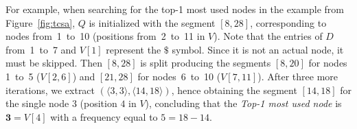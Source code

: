 \begin{itemize}[leftmargin=3mm]
\begin{itemize}
	For example, when searching for the top-1 most used nodes in the example from Figure~\ref{fig:tcsa}, $Q$ is initialized with
	the segment $[8, 28]$, corresponding to nodes from~1~to~10 (positions from~2~to~11 in $V$). Note
	that the entries of $D$ from~1~to~7 and $V[1]$ represent the $\$$ symbol. Since it is not an actual node, it
	 must be skipped. Then $[8, 28]$ is split producing the segments $[8, 20]$ for nodes 1~to~5 ($V[2,6]$)
	and $[21, 28]$ for nodes~6~to~10 ($V[7,11]$). After three more iterations, we extract
	$(\langle 3,3\rangle, \langle 14,18\rangle)$, hence obtaining the segment $[14, 18]$ for
	the single node 3 (position $4$ in $V$), concluding that the  {\em Top-1 most used node} is 
	$\mathbf{3}=V[4]$ with a frequency equal to $5=18-14$.





\end{itemize}
\end{itemize}
